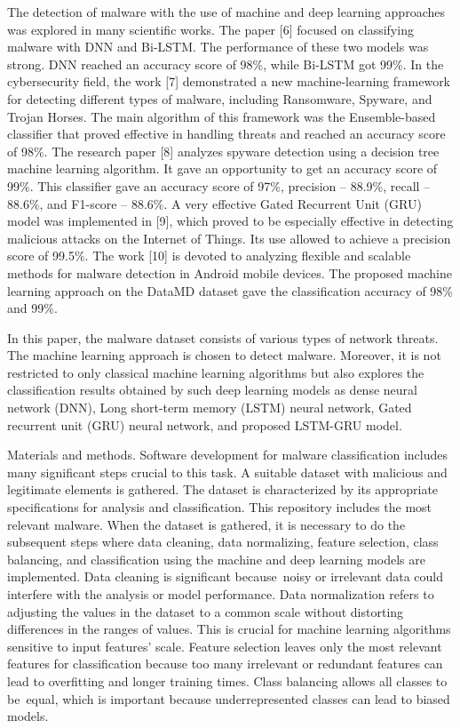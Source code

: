 \begin{multicols}{2}
The detection of malware with the use of machine and deep learning
approaches was explored in many scientific works. The paper {[}6{]}
focused on classifying malware with DNN and Bi-LSTM. The performance of
these two models was strong. DNN reached an accuracy score of 98\%,
while Bi-LSTM got 99\%. In the cybersecurity field, the work {[}7{]}
demonstrated a new machine-learning framework for detecting different
types of malware, including Ransomware, Spyware, and Trojan Horses. The
main algorithm of this framework was the Ensemble-based classifier that
proved effective in handling threats and reached an accuracy score of
98\%. The research paper {[}8{]} analyzes spyware detection using a
decision tree machine learning algorithm. It gave an opportunity to get
an accuracy score of 99\%. This classifier gave an accuracy score of
97\%, precision -- 88.9\%, recall -- 88.6\%, and F1-score -- 88.6\%. A
very effective Gated Recurrent Unit (GRU) model was implemented in
{[}9{]}, which proved to be especially effective in detecting malicious
attacks on the Internet of Things. Its use allowed to achieve a
precision score of 99.5\%. The work {[}10{]} is devoted to analyzing
flexible and scalable methods for malware detection in Android mobile
devices. The proposed machine learning approach on the DataMD dataset
gave the classification accuracy of 98\% and 99\%.

In this paper, the malware dataset consists of various types of network
threats. The machine learning approach is chosen to detect malware.
Moreover, it is not restricted to only classical machine learning
algorithms but also explores the classification results obtained by such
deep learning models as dense neural network (DNN), Long short-term
memory (LSTM) neural network, Gated recurrent unit (GRU) neural network,
and proposed LSTM-GRU model.

Materials and methods. Software development for malware classification
includes many significant steps crucial to this task. A suitable dataset
with malicious and legitimate elements is gathered. The dataset is
characterized by its appropriate specifications for analysis and
classification. This repository includes the most relevant malware. When
the dataset is gathered, it is necessary to do the subsequent steps
where data cleaning, data normalizing, feature selection, class
balancing, and classification using the machine and deep learning models
are implemented. Data cleaning is significant because~noisy or
irrelevant data could interfere with the analysis or model performance.
Data normalization refers to adjusting the values in the dataset to a
common scale without distorting differences in the ranges of values.
This is crucial for machine learning algorithms sensitive to input
features' scale. Feature selection leaves only the most relevant
features for classification because too many irrelevant or redundant
features can lead to overfitting and longer training times. Class
balancing allows all classes to be~equal, which is important because
underrepresented classes can lead to biased models.


\end{multicols}
